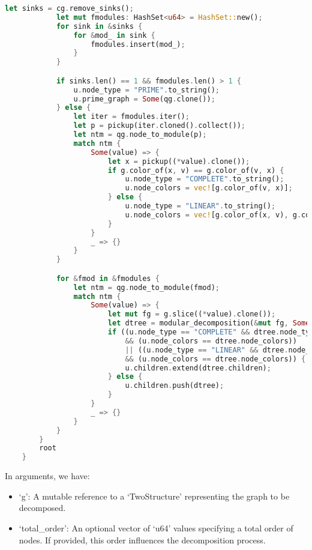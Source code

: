 \begin{lstlisting}[language=Rust, style=rust, caption={Defining the modular decomposition}, label={lst:rust-define-modular-decomposition}, firstnumber=1]
            let sinks = cg.remove_sinks();
            let mut fmodules: HashSet<u64> = HashSet::new();
            for sink in &sinks {
                for &mod_ in sink {
                    fmodules.insert(mod_);
                }
            }

            if sinks.len() == 1 && fmodules.len() > 1 {
                u.node_type = "PRIME".to_string();
                u.prime_graph = Some(qg.clone());
            } else {
                let iter = fmodules.iter();
                let p = pickup(iter.cloned().collect());
                let ntm = qg.node_to_module(p);
                match ntm {
                    Some(value) => {
                        let x = pickup((*value).clone());
                        if g.color_of(x, v) == g.color_of(v, x) {
                            u.node_type = "COMPLETE".to_string();
                            u.node_colors = vec![g.color_of(v, x)];
                        } else {
                            u.node_type = "LINEAR".to_string();
                            u.node_colors = vec![g.color_of(x, v), g.color_of(v, x)];
                        }
                    }
                    _ => {}
                }
            }

            for &fmod in &fmodules {
                let ntm = qg.node_to_module(fmod);
                match ntm {
                    Some(value) => {
                        let mut fg = g.slice((*value).clone());
                        let dtree = modular_decomposition(&mut fg, Some(total_order.clone()));
                        if ((u.node_type == "COMPLETE" && dtree.node_type == "COMPLETE")
                            && (u.node_colors == dtree.node_colors))
                            || ((u.node_type == "LINEAR" && dtree.node_type == "LINEAR")
                            && (u.node_colors == dtree.node_colors)) {
                            u.children.extend(dtree.children);
                        } else {
                            u.children.push(dtree);
                        }
                    }
                    _ => {}
                }
            }
        }
        root
    }
\end{lstlisting}

In arguments, we have:
\begin{itemize}
    \item `g': A mutable reference to a `TwoStructure' representing the graph to be decomposed.
    \item `total\_order': An optional vector of `u64' values specifying a total order of nodes.
    If provided, this order influences the decomposition process.
\end{itemize}

